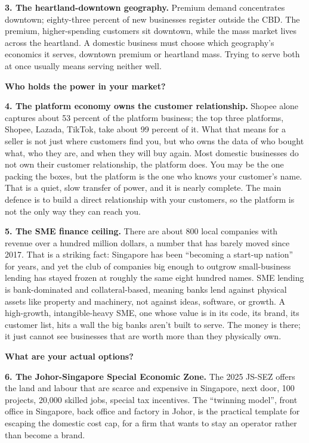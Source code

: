 \documentclass[10pt,twoside,openany]{memoir}
\begin{document}
{{{{{{{{{{{\textbf{3. The heartland-downtown geography.} Premium demand
concentrates downtown; eighty-three percent of new businesses register
outside the CBD. The premium, higher-spending customers sit downtown,
while the mass market lives across the heartland. A domestic business
must choose which geography's economics it serves, downtown premium or
heartland mass. Trying to serve both at once usually means serving
neither well.

\textbf{Who holds the power in your market?}

\textbf{4. The platform economy owns the customer relationship.} Shopee
alone captures about 53 percent of the platform business; the top three
platforms, Shopee, Lazada, TikTok, take about 99 percent of it. What
that means for a seller is not just where customers find you, but who
owns the data of who bought what, who they are, and when they will buy
again. Most domestic businesses do not own their customer relationship,
the platform does. You may be the one packing the boxes, but the
platform is the one who knows your customer's name. That is a quiet,
slow transfer of power, and it is nearly complete. The main defence is
to build a direct relationship with your customers, so the platform is
not the only way they can reach you.

\textbf{5. The SME finance ceiling.} There are about 800 local companies
with revenue over a hundred million dollars, a number that has barely
moved since 2017. That is a striking fact: Singapore has been ``becoming
a start-up nation'' for years, and yet the club of companies big enough
to outgrow small-business lending has stayed frozen at roughly the same
eight hundred names. SME lending is bank-dominated and collateral-based,
meaning banks lend against physical assets like property and machinery,
not against ideas, software, or growth. A high-growth, intangible-heavy
SME, one whose value is in its code, its brand, its customer list, hits
a wall the big banks aren't built to serve. The money is there; it just
cannot see businesses that are worth more than they physically own.

\textbf{What are your actual options?}

\textbf{6. The Johor-Singapore Special Economic Zone.} The 2025 JS-SEZ
offers the land and labour that are scarce and expensive in Singapore,
next door, 100 projects, 20,000 skilled jobs, special tax incentives.
The ``twinning model'', front office in Singapore, back office and
factory in Johor, is the practical template for escaping the domestic
cost cap, for a firm that wants to stay an operator rather than become a
brand.

}}}}}}}}}}}
\end{document}
